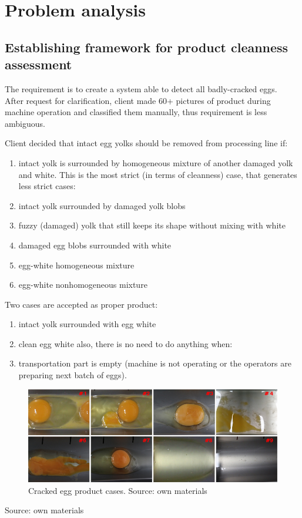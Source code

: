\documentclass[12pt,twoside,a4paper]{article}
\begin{document}
\section{Problem analysis}
\subsection{Establishing framework for product cleanness assessment}

The requirement is to create a system able to detect all badly-cracked eggs.\\
After request for clarification, client made 60+ pictures of product during machine operation and classified them manually, thus requirement is less ambiguous.

Client decided that intact egg yolks should be removed from processing line if:

\begin{enumerate}
\item intact yolk is surrounded by homogeneous mixture of another damaged yolk and white.
This is the most strict (in terms of cleanness) case, that generates less strict cases:
\item intact yolk surrounded by damaged yolk blobs
\item fuzzy (damaged) yolk that still keeps its shape without mixing with white
\item damaged egg blobs surrounded with white
\item egg-white homogeneous mixture
\item egg-white nonhomogeneous mixture
\end{enumerate}
Two cases are accepted as proper product:
\begin{enumerate}[resume]
\item intact yolk surrounded with egg white
\item clean egg white
also, there is no need to do anything when:
\item transportation part is empty (machine is not operating or the operators are preparing next batch of eggs).
\end{enumerate}

 

\begin{figure}[H]
\centering
\includegraphics[width=0.8\paperwidth]{8of9}
\caption{Cracked egg product cases. Source: own materials }
\end{figure}
Source: own materials 
\end{document}
